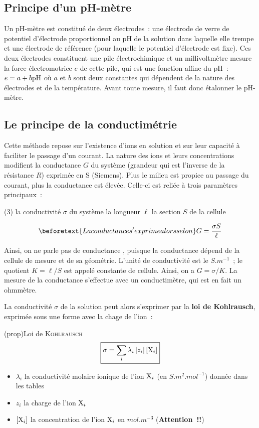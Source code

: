 \documentclass[../main/main.tex]{subfiles}
\begin{document}
{	\subsection{Principe d'un pH-mètre}

	Un pH-mètre est constitué de deux électrodes~: une électrode de verre de
	potentiel d'électrode proportionnel au pH de la solution dans laquelle elle
	trempe et une électrode de référence (pour laquelle le potentiel d'électrode est
	fixe). Ces deux électrodes constituent une pile électrochimique et un
	millivoltmètre mesure la force électromotrice $e$ de cette pile, qui est une
	fonction affine du pH~: $e = a + b \rm pH$ où $a$ et $b$ sont deux constantes
	qui dépendent de la nature des électrodes et de la température. Avant toute
	mesure, il faut donc étalonner le pH-mètre.

	\subsection{Le principe de la conductimétrie}

	Cette méthode repose sur l'existence d'ions en solution et sur leur capacité à
	faciliter le passage d'un courant. La nature des ions et leurs concentrations
	modifient la conductance $G$ du système (grandeur qui est l'inverse de la
	résistance $R$) exprimée en \si{S} (Siemens). Plus le milieu est propice au
	passage du courant, plus la conductance est élevée. Celle-ci est reliée à trois
	paramètres principaux~:

	\begin{tasks}[label=\arabic*)](3)
		\task la conductivité $\sigma$ du système
		\task la longueur $\ell$
		\task la section $S$ de la cellule
	\end{tasks}
	\begin{gather*}
		\beforetext{La conductance s'exprime alors selon}
		G = \frac{\sigma S}{\ell}
	\end{gather*}

	Ainsi, on ne parle pas de conductance , puisque la
	conductance dépend de la cellule de mesure et de sa géométrie. L'unité de
	conductivité est le $\si{S.m^{-1}}$~; le quotient $K = \ell / S$ est appelé
	constante de cellule. Ainsi, on a $G = \sigma / K$. La mesure de la conductance
	s'effectue avec un conductimètre, qui est en fait un ohmmètre.\bigbreak

	La conductivité $\sigma$ de la solution peut alors s'exprimer par la \textbf{loi
		de Kohlrausch}, exprimée sous une forme avec la chage de l'ion~:
	\begin{tcb}(prop){Loi de \textsc{Kohlrausch}}
		\[\boxed{\sigma = \sum_{i} \lambda_i \left|z_i\right| [{\rm X}_i]}\]
		\begin{itemize}
			\item $\lambda_i$ la conductivité molaire ionique de l'ion ${\rm X}_i$ (en
			      $\si{S.m^2.mol^{-1}}$) donnée dans les tables
			\item $z_i$ la charge de l'ion ${\rm X}_i$
			\item $[{\rm X}_i]$ la concentration de l'ion ${\rm X}_i$ en
			      $\si{mol.m^{-3}}$ (\textbf{Attention~!!})
		\end{itemize}
	\end{tcb}

}
\end{document}
